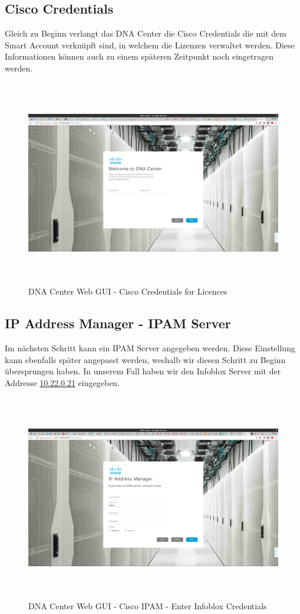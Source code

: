 \subsection{Cisco Credentials}
Gleich zu Beginn verlangt das DNA Center die Cisco Credentials die mit dem Smart Account verknüpft sind, in welchem die Lizenzen verwaltet werden. Diese Informationen können auch zu einem späteren Zeitpunkt noch eingetragen werden.
\begin{figure}[H]
	\centering
	\includegraphics[height=9cm]{img/sc_006.png}
	\caption{DNA Center Web GUI - Cisco Credentials for Licences}
	\label{fig:installguide-dna-center-gui-2}
\end{figure}

\subsection{IP Address Manager - IPAM Server}

Im nächsten Schritt kann ein IPAM Server angegeben werden. Diese Einstellung kann ebenfalls später angepasst werden, weshalb wir diesen Schritt zu Beginn übersprungen haben. In unserem Fall haben wir den Infoblox Server mit der Addresse \url{10.22.0.21} eingegeben. 

\begin{figure}[H]
	\centering
	\includegraphics[height=9cm]{img/sc_007.png}
	\caption{DNA Center Web GUI - Cisco IPAM - Enter Infoblox Credentials}
	\label{fig:installguide-dna-center-gui-3}
\end{figure}

